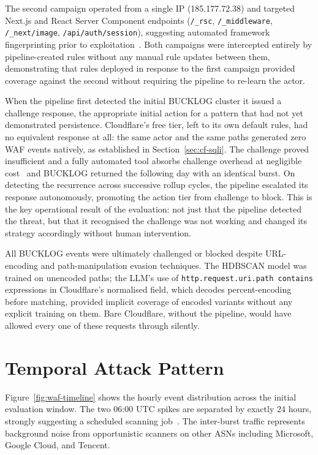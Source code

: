 \documentclass[12pt, a4paper]{report}   %
\begin{document}
The second campaign operated from a single IP (185.177.72.38)
and targeted Next.js and React Server Component endpoints
(\texttt{/\_rsc}, \texttt{/\_middleware},
\texttt{/\_next/image}, \texttt{/api/auth/session}),
suggesting automated framework fingerprinting prior to
exploitation~\cite{mitre-recon}. Both campaigns were
intercepted entirely by pipeline-created rules without any
manual rule updates between them, demonstrating that rules
deployed in response to the first campaign provided coverage
against the second without requiring the pipeline to re-learn
the actor.

When the pipeline first detected the initial BUCKLOG cluster
it issued a challenge response, the appropriate initial action
for a pattern that had not yet demonstrated persistence.
Cloudflare's free tier, left to its own default rules, had no
equivalent response at all: the same actor and the same paths
generated zero WAF events natively, as established in
Section~\ref{sec:cf-sqli}. The challenge proved insufficient
and a fully automated tool absorbs challenge overhead at
negligible cost~\cite{cf-captcha-end} and BUCKLOG returned
the following day with an identical burst. On detecting the
recurrence across successive rollup cycles, the pipeline
escalated its response autonomously, promoting the action tier
from challenge to block. This is the key operational result of
the evaluation: not just that the pipeline detected the threat,
but that it recognised the challenge was not working and
changed its strategy accordingly without human intervention.

All BUCKLOG events were ultimately challenged or blocked
despite URL-encoding and path-manipulation evasion techniques.
The HDBSCAN model was trained on unencoded paths; the LLM's
use of \texttt{http.request.uri.path contains} expressions in
Cloudflare's normalised field, which decodes percent-encoding
before matching, provided implicit coverage of encoded variants
without any explicit training on them. Bare Cloudflare, without
the pipeline, would have allowed every one of these requests
through silently.

\section{Temporal Attack Pattern}
\label{sec:temporal}

Figure~\ref{fig:waf-timeline} shows the hourly event
distribution across the initial evaluation window. The two
06:00 UTC spikes are separated by exactly 24 hours, strongly
suggesting a scheduled scanning job~\cite{mitre-recon}. The
inter-burst traffic represents background noise from
opportunistic scanners on other ASNs including Microsoft,
Google Cloud, and Tencent.
\end{document}
